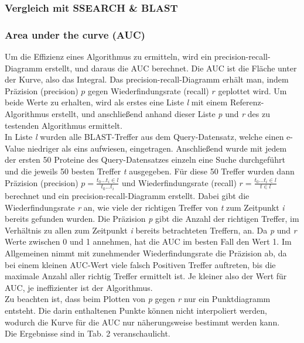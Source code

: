\documentclass{article}
\begin{document}
\subsubsection{Vergleich mit SSEARCH \& BLAST}

\subsubsection{Area under the curve (AUC)}

Um die Effizienz eines Algorithmus zu ermitteln, wird ein precision-recall-Diagramm erstellt, und daraus die AUC berechnet. Die AUC ist die Fläche unter der Kurve, also das Integral. Das precision-recall-Diagramm erhält man, indem Präzision (precision) $p$ gegen Wiederfindungsrate (recall) $r$ geplottet wird. Um beide Werte zu erhalten, wird als erstes eine Liste \textit l mit einem Referenz-Algorithmus erstellt, und anschließend anhand dieser Liste \textit p und \textit r des zu testenden Algorithmus ermittelt.\\In Liste \textit l wurden alle BLAST-Treffer aus dem Query-Datensatz, welche einen e-Value niedriger als eins aufwiesen, eingetragen. Anschließend wurde mit jedem der ersten 50 Proteine des Query-Datensatzes einzeln eine Suche durchgeführt und die jeweils 50 besten Treffer \textit t ausgegeben. Für diese 50 Treffer wurden dann Präzision (precision) $p = \frac{t_0 ... t_i \in l}{t_0 ... t_i}$ und Wiederfindungsrate (recall) $r = \frac {t_0 ... t_i \in l}{t \in l}$ berechnet und ein precision-recall-Diagramm erstellt. Dabei gibt die Wiederfindungsrate \textit r an, wie viele der richtigen Treffer von \textit t zum Zeitpunkt \textit i bereits gefunden wurden. Die Präzision \textit p gibt die Anzahl der richtigen Treffer, im Verhältnis zu allen zum Zeitpunkt \textit i bereits betrachteten Treffern, an. Da \textit p und \textit r Werte zwischen 0 und 1 annehmen, hat die AUC im besten Fall den Wert 1. Im Allgemeinen nimmt mit zunehmender Wiederfindungsrate die Präzision ab, da bei einem kleinen AUC-Wert viele falsch Positiven Treffer auftreten, bis die maximale Anzahl aller richtig Treffer ermittelt ist. Je kleiner also der Wert für AUC, je ineffizienter ist der Algorithmus.\\Zu beachten ist, dass beim Plotten von \textit p gegen \textit r nur ein Punktdiagramm entsteht. Die darin enthaltenen Punkte können nicht interpoliert werden, wodurch die Kurve für die AUC nur näherungsweise bestimmt werden kann.\\Die Ergebnisse sind in Tab. 2 veranschaulicht.
\end{document}
